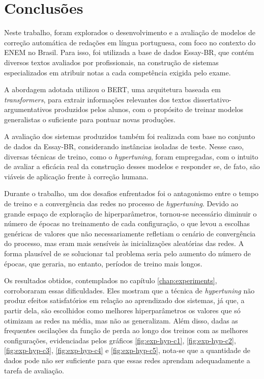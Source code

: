 \chapter{Conclusões}

Neste trabalho, foram explorados o desenvolvimento e a avaliação de modelos de correção automática de redações em língua portuguesa, com foco no contexto do ENEM no Brasil. Para isso, foi utilizada a base de dados Essay-BR, que contém diversos textos avaliados por profissionais, na construção de sistemas especializados em atribuir notas a cada competência exigida pelo exame.

A abordagem adotada utilizou o BERT, uma arquitetura baseada em \textit{transformers}, para extrair informações relevantes dos textos dissertativo-argumentativos produzidos pelos alunos, com o propósito de treinar modelos generalistas o suficiente para pontuar novas produções.

A avaliação dos sistemas produzidos também foi realizada com base no conjunto de dados da Essay-BR, considerando instâncias isoladas de teste. Nesse caso, diversas técnicas de treino, como o \textit{hypertuning}, foram empregadas, com o intuito de avaliar a eficácia real da construção desses modelos e responder se, de fato, são viáveis de aplicação frente à correção humana.

Durante o trabalho, um dos desafios enfrentados foi o antagonismo entre o tempo de treino e a convergência das redes no processo de \textit{hypertuning}. Devido ao grande espaço de exploração de hiperparâmetros, tornou-se necessário diminuir o número de épocas no treinamento de cada configuração, o que levou a escolhas genéricas de valores que não necessariamente refletiam o cenário de convergência do processo, mas eram mais sensíveis às inicializações aleatórias das redes. A forma plausível de se solucionar tal problema seria pelo aumento do número de épocas, que geraria, no entanto, períodos de treino mais longos.

Os resultados obtidos, contemplados no capítulo \ref{chap:experiments}, corroboraram essas dificuldades. Eles mostram que a técnica de \textit{hypertuning} não produz efeitos satisfatórios em relação ao aprendizado dos sistemas, já que, a partir dela, são escolhidos como melhores hiperparâmetros os valores que só otimizam as redes na média, mas não as generalizam. Além disso, dadas as frequentes oscilações da função de perda ao longo dos treinos com as melhores configurações, evidenciadas pelos gráficos \ref{fig:exp-hyp-c1}, \ref{fig:exp-hyp-c2}, \ref{fig:exp-hyp-c3}, \ref{fig:exp-hyp-c4} e \ref{fig:exp-hyp-c5}, nota-se que a quantidade de dados pode não ser suficiente para que essas redes aprendam adequadamente a tarefa de avaliação.

